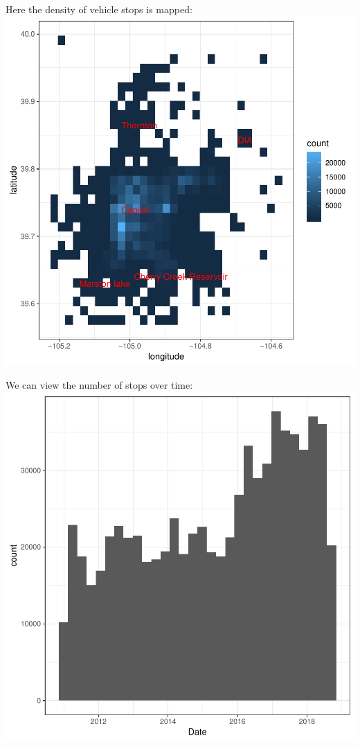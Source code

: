 \documentclass{article}
\begin{document}
\newpage
Here the density of vehicle stops is mapped:\\

\includegraphics{DenverPoliceStops-006}

\newpage
We can view the number of stops over time:\\

\includegraphics{DenverPoliceStops-007}
\end{document}
